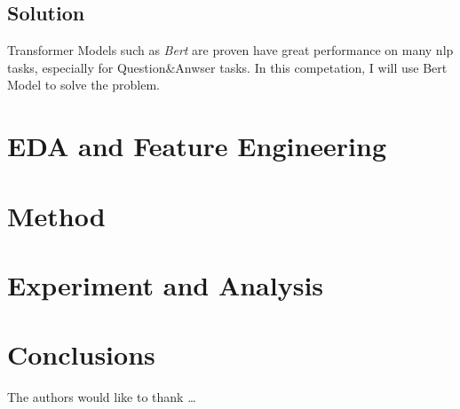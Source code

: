 \subsection{Solution}
Transformer Models such as \textit{Bert} are proven have great performance on many nlp tasks, especially for Question\&Anwser tasks.
In this competation, I will use Bert Model to solve the problem.
\section{EDA and Feature Engineering} \label{sec-eda}

\section{Method} \label{sec-method}

\section{Experiment and Analysis} \label{sec-experiment}

\section{Conclusions} \label{sec-conclusions}


The authors would like to thank \ldots

